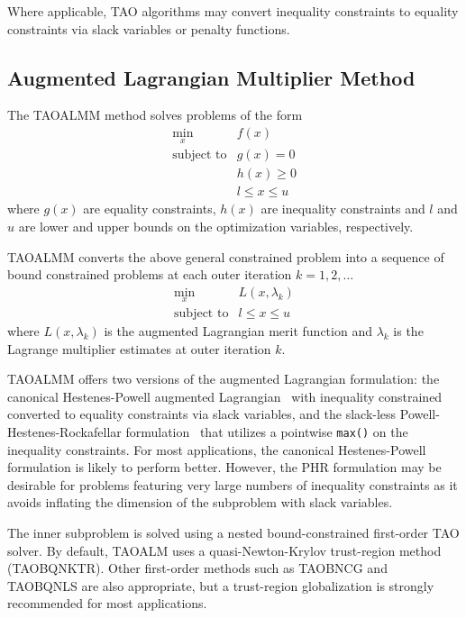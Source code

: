 \documentclass[]{book}
\begin{document}
Where applicable, TAO algorithms may convert inequality constraints
to equality constraints via slack variables or penalty functions.

\subsection{Augmented Lagrangian Multiplier Method}

The TAOALMM method solves problems of the form
\[
\begin{array}{ll}
\displaystyle \min_{x} & f(x) \\
\mbox{subject to} & g(x) = 0\\
                  & h(x) \geq 0 \\
                  & l \leq x \leq u
\end{array}
\]
where $g(x)$ are equality constraints, $h(x)$ are inequality constraints
and $l$ and $u$ are lower and upper bounds on the optimization variables,
respectively.

TAOALMM converts the above general constrained problem into a sequence of
bound constrained problems at each outer iteration $k = 1,2,\dots$
\[
\begin{array}{ll}
\displaystyle \min_{x} & L(x, \lambda_k) \\
\mbox{subject to} & l \leq x \leq u
\end{array}
\]
where $L(x, \lambda_k)$ is the augmented Lagrangian merit function and $\lambda_k$
is the Lagrange multiplier estimates at outer iteration $k$.

TAOALMM offers two versions of the augmented Lagrangian formulation: the
canonical Hestenes-Powell augmented Lagrangian~\cite{hestenes1969multiplier,powell1969method}
with inequality constrained converted to equality constraints via slack variables,
and the slack-less Powell-Hestenes-Rockafellar formulation~\cite{rockafellar1974augmented}
that utilizes a pointwise {\tt max()} on the inequality constraints. For most applications,
the canonical Hestenes-Powell formulation is likely to perform better. However, the PHR
formulation may be desirable for problems featuring very large numbers of inequality
constraints as it avoids inflating the dimension of the subproblem with slack variables.

The inner subproblem is solved using a nested bound-constrained first-order TAO solver.
By default, TAOALM uses a quasi-Newton-Krylov trust-region method (TAOBQNKTR). Other
first-order methods such as TAOBNCG and TAOBQNLS are also appropriate, but a trust-region
globalization is strongly recommended for most applications.
\end{document}
